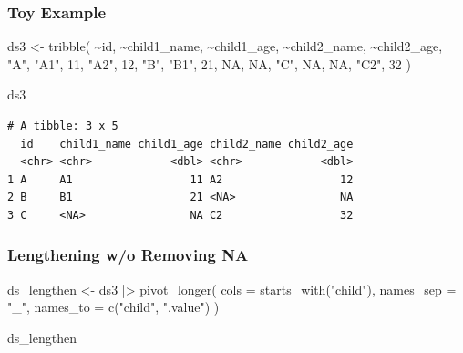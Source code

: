 \documentclass[
  letterpaper,
  DIV=11,
  numbers=noendperiod]{scrreprt}
\newenvironment{Shaded}{\begin{snugshade}}{\end{snugshade}}
\newcommand{\AttributeTok}[1]{\textcolor[rgb]{0.40,0.45,0.13}{#1}}
\newcommand{\ConstantTok}[1]{\textcolor[rgb]{0.56,0.35,0.01}{#1}}
\newcommand{\DecValTok}[1]{\textcolor[rgb]{0.68,0.00,0.00}{#1}}
\newcommand{\FunctionTok}[1]{\textcolor[rgb]{0.28,0.35,0.67}{#1}}
\newcommand{\NormalTok}[1]{\textcolor[rgb]{0.00,0.23,0.31}{#1}}
\newcommand{\OtherTok}[1]{\textcolor[rgb]{0.00,0.23,0.31}{#1}}
\newcommand{\SpecialCharTok}[1]{\textcolor[rgb]{0.37,0.37,0.37}{#1}}
\newcommand{\StringTok}[1]{\textcolor[rgb]{0.13,0.47,0.30}{#1}}
\begin{document}
\subsubsection{Toy Example}\label{toy-example-2}

\begin{Shaded}
\begin{Highlighting}[]
\NormalTok{ds3 }\OtherTok{\textless{}{-}} \FunctionTok{tribble}\NormalTok{(}
  \SpecialCharTok{\textasciitilde{}}\NormalTok{id, }\SpecialCharTok{\textasciitilde{}}\NormalTok{child1\_name, }\SpecialCharTok{\textasciitilde{}}\NormalTok{child1\_age, }\SpecialCharTok{\textasciitilde{}}\NormalTok{child2\_name, }\SpecialCharTok{\textasciitilde{}}\NormalTok{child2\_age,}
  \StringTok{"A"}\NormalTok{, }\StringTok{"A1"}\NormalTok{, }\DecValTok{11}\NormalTok{, }\StringTok{"A2"}\NormalTok{, }\DecValTok{12}\NormalTok{,}
  \StringTok{"B"}\NormalTok{, }\StringTok{"B1"}\NormalTok{, }\DecValTok{21}\NormalTok{, }\ConstantTok{NA}\NormalTok{, }\ConstantTok{NA}\NormalTok{,}
  \StringTok{"C"}\NormalTok{, }\ConstantTok{NA}\NormalTok{, }\ConstantTok{NA}\NormalTok{, }\StringTok{"C2"}\NormalTok{, }\DecValTok{32}
\NormalTok{)}

\NormalTok{ds3}
\end{Highlighting}
\end{Shaded}

\begin{verbatim}
# A tibble: 3 x 5
  id    child1_name child1_age child2_name child2_age
  <chr> <chr>            <dbl> <chr>            <dbl>
1 A     A1                  11 A2                  12
2 B     B1                  21 <NA>                NA
3 C     <NA>                NA C2                  32
\end{verbatim}

\subsubsection{Lengthening w/o Removing
NA}\label{lengthening-wo-removing-na}

\begin{Shaded}
\begin{Highlighting}[]
\NormalTok{ds\_lengthen }\OtherTok{\textless{}{-}}\NormalTok{ ds3 }\SpecialCharTok{|\textgreater{}} 
  \FunctionTok{pivot\_longer}\NormalTok{(}
    \AttributeTok{cols =} \FunctionTok{starts\_with}\NormalTok{(}\StringTok{"child"}\NormalTok{),}
    \AttributeTok{names\_sep =} \StringTok{"\_"}\NormalTok{,}
    \AttributeTok{names\_to =} \FunctionTok{c}\NormalTok{(}\StringTok{"child"}\NormalTok{, }\StringTok{".value"}\NormalTok{)}
\NormalTok{  )}

\NormalTok{ds\_lengthen}
\end{Highlighting}
\end{Shaded}
\end{document}
